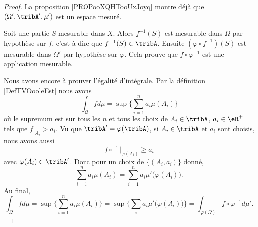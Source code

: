 \begin{proof}
	La proposition \ref{PROPooXQHTooUxJoyq} montre déjà que \( (\Omega',\tribA',\mu')\) est un espace mesuré.

	Soit une partie \( S\) mesurable dans \( X\). Alors \( f^{-1}(S)\) est mesurable dans \( \Omega\) par hypothèse sur \( f\), c'est-à-dire que \( f^{-1}(S)\in\tribA\). Ensuite \( (\varphi\circ f^{-1})(S)\) est mesurable dans \( \Omega'\) par hypothèse sur \( \varphi\). Cela prouve que \(  f\circ\varphi^{-1} \) est une application mesurable.

	Nous avons encore à prouver l'égalité d'intégrale. Par la définition \ref{DefTVOooleEst} nous avons
	\begin{equation}
		\int_{\Omega}fd\mu=\sup\{ \sum_{i=1}^na_i\mu(A_i) \}
	\end{equation}
	où le supremum est sur tous les \( n\) et tous les choix de \( A_i\in\tribA\), \( a_i\in\eR^+\) tels que \( f|_{A_i}>a_i\). Vu que \( \tribA'=\varphi(\tribA)\), si \( A_i\in \tribA\) et \( a_i\) sont choisis, nous avons aussi
	\begin{equation}
		f\circ^{-1}|_{\varphi(A_i)}\geq a_i
	\end{equation}
	avec \( \varphi(A_i)\in\tribA'\). Donc pour un choix de \( \{ (A_i,a_i) \}\) donné,
	\begin{equation}
		\sum_{i=1}^na_i\mu(A_i)=\sum_{i=1}^na_i\mu'\big( \varphi(A_i) \big).
	\end{equation}
	Au final,
	\begin{equation}
		\int_{\Omega}fd\mu=\sup\{ \sum_{i=1}^na_i\mu(A_i) \}=\sup\{ \sum_ia_i\mu'\big( \varphi(A_i) \big) \}=\int_{\varphi(\Omega)}f\circ\varphi^{-1}d\mu'.
	\end{equation}
\end{proof}

